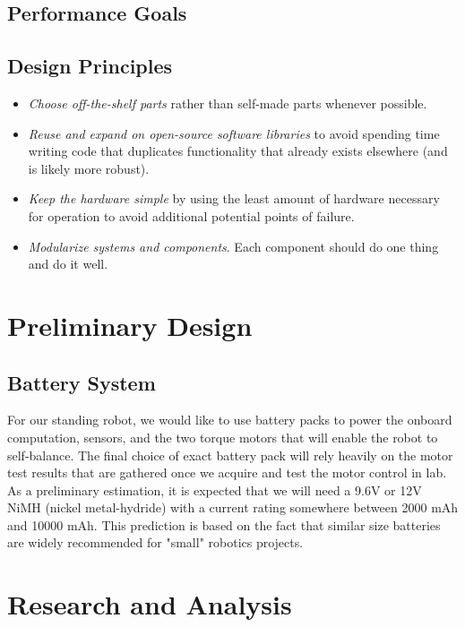 \documentclass[11pt]{report}
\begin{document}
\begin{spacing}{1.5}
\subsection*{Performance Goals}



\subsection*{Design Principles}

\begin{itemize}[noitemsep,nolistsep]
    \item \emph{Choose off-the-shelf parts} rather than self-made parts whenever possible.
    \item \emph{Reuse and expand on open-source software libraries} to avoid spending time writing code that duplicates functionality that already exists elsewhere (and is likely more robust).
    \item \emph{Keep the hardware simple} by using the least amount of hardware necessary for operation to avoid additional potential points of failure.
    \item \emph{Modularize systems and components}. Each component should do one thing and do it well.
\end{itemize}

\section*{Preliminary Design} %


\subsection*{Battery System}

For our standing robot, we would like to use battery packs to power the onboard computation, sensors, and the two torque motors that will enable the robot to self-balance. The final choice of exact battery pack will rely heavily on the motor test results that are gathered once we acquire and test the motor control in lab. As a preliminary estimation, it is expected that we will need a 9.6V or 12V NiMH (nickel metal-hydride) with a current rating somewhere between 2000 mAh and 10000 mAh. This prediction is based on the fact that similar size batteries are widely recommended for "small" robotics projects.


\section*{Research and Analysis} %


\end{spacing}
\end{document}
